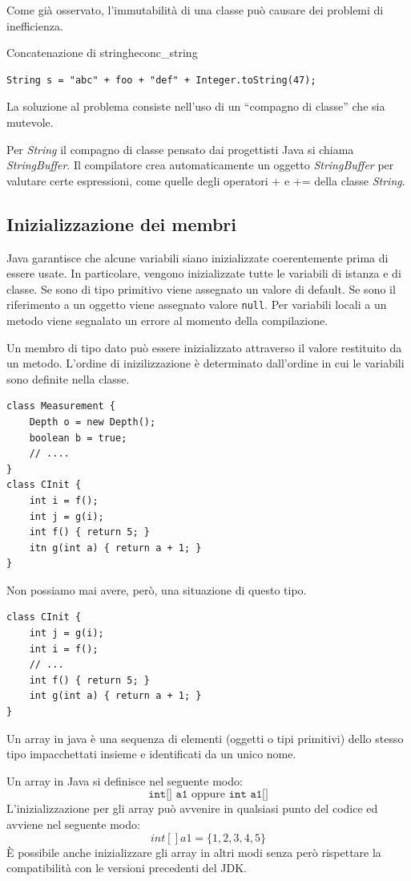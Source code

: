 \documentclass[12pt]{report}
\newcommand{\nmu}{}
\begin{document}
Come già osservato, l'immutabilità di una classe può causare dei problemi di inefficienza.
\begin{example}{\nmu Concatenazione di stringhe}{conc_string}
\begin{lstlisting}[style=javastyle]
String s = "abc" + foo + "def" + Integer.toString(47);
\end{lstlisting}
La soluzione al problema consiste nell'uso di un ``compagno di classe'' che sia mutevole.

Per \textit{String} il compagno di classe pensato dai progettisti Java si chiama \textit{StringBuffer}. Il compilatore crea automaticamente un oggetto \textit{StringBuffer} per valutare certe espressioni, come quelle degli operatori + e += della classe \textit{String}.
\end{example}
\subsection{Inizializzazione dei membri}
Java garantisce che alcune variabili siano inizializzate coerentemente prima di essere usate. In particolare, vengono inizializzate tutte le variabili di istanza e di classe. Se sono di tipo primitivo viene assegnato un valore di default. Se sono il riferimento a un oggetto viene assegnato valore \texttt{null}. Per variabili locali a un metodo viene segnalato un errore al momento della compilazione.

Un membro di tipo dato può essere inizializzato attraverso il valore restituito da un metodo. L'ordine di inizilizzazione è determinato dall'ordine in cui le variabili sono definite nella classe.
\begin{lstlisting}[style=javastyle]
class Measurement {
	Depth o = new Depth();
	boolean b = true;
	// ....
}
class CInit {
	int i = f();
	int j = g(i);
	int f() { return 5; }
	itn g(int a) { return a + 1; }
}
\end{lstlisting}
Non possiamo mai avere, però, una situazione di questo tipo.
\begin{lstlisting}[style=javastyle]
class CInit {
	int j = g(i);
	int i = f();
	// ...
	int f() { return 5; }
	int g(int a) { return a + 1; }
}
\end{lstlisting}
Un array in java è una sequenza di elementi (oggetti o tipi primitivi) dello stesso tipo impacchettati insieme e identificati da un unico nome.

Un array in Java si definisce nel seguente modo:
\[
\texttt{int[] a1} \text{ oppure } \texttt{int a1[]}
\]
L'inizializzazione per gli array può avvenire in qualsiasi punto del codice ed avviene nel seguente modo:
\[
int[] a1 = \{1, 2, 3, 4, 5\}
\]
È possibile anche inizializzare gli array in altri modi senza però rispettare la compatibilità con le versioni precedenti del JDK.
\end{document}
